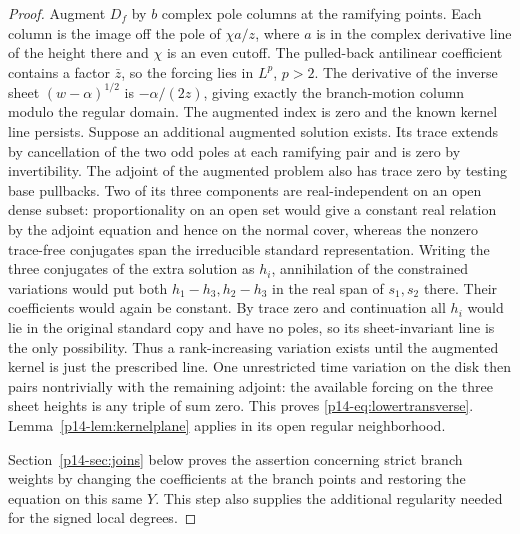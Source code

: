 \begin{proof}
Augment $D_f$ by $b$ complex pole columns at the ramifying points.
Each column is the image off the pole of $\chi a/z$, where $a$ is
in the complex derivative line of the height there and $\chi$ is an
even cutoff. The pulled-back antilinear coefficient contains a
factor $\bar z$, so the forcing lies in $L^p$, $p>2$. The derivative
of the inverse sheet $(w-\alpha)^{1/2}$ is $-\alpha/(2z)$, giving
exactly the branch-motion column modulo the regular domain. The
augmented index is zero and the known kernel line persists. Suppose
an additional augmented solution exists. Its trace extends by
cancellation of the two odd poles at each ramifying pair and is zero
by invertibility. The adjoint of the augmented problem also has
trace zero by testing base pullbacks. Two of its three components
are real-independent on an open dense subset: proportionality on
an open set would give a constant real relation by the adjoint
equation and hence on the normal cover, whereas the nonzero
trace-free conjugates span the irreducible standard representation.
Writing the three conjugates of the extra solution as $h_i$, annihilation
of the constrained variations would put both $h_1-h_3,h_2-h_3$ in
the real span of $s_1,s_2$ there. Their coefficients would again be
constant. By trace zero and continuation all $h_i$ would lie in
the original standard copy and have no poles, so its sheet-invariant
line is the only possibility. Thus a rank-increasing variation exists
until the augmented kernel is just the prescribed line. One unrestricted
time variation on the disk then pairs nontrivially with the remaining
adjoint: the available forcing on the three sheet heights is any
triple of sum zero. This proves \eqref{p14-eq:lowertransverse}.
Lemma~\ref{p14-lem:kernelplane} applies in its open regular neighborhood.

Section~\ref{p14-sec:joins} below proves the assertion concerning strict
branch weights by changing the coefficients at the branch points and
restoring the equation on this same $Y$. This step also supplies the
additional regularity needed for the signed local degrees.
\end{proof}

